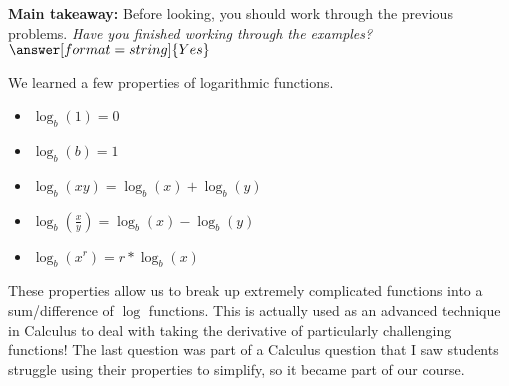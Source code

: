 \documentclass{ximera}
\begin{document}
\begin{question}
\textbf{Main takeaway:} Before looking, you should work through the previous problems. \textit{Have you finished working through the examples?} $\answer[format=string]{Yes}$
\begin{feedback}[correct]
We learned a few properties of logarithmic functions. 
\begin{itemize}
	\item $\log_b(1) = 0$
	\item $\log_b(b) = 1$
	\item $\log_b(xy) = \log_b{(x)} + \log_b{(y)}$
	\item $\log_b(\frac{x}{y}) = \log_b{(x)} - \log_b{(y)}$
	\item $\log_b(x^r) = r*\log_b{(x)}$
\end{itemize}

These properties allow us to break up extremely complicated functions into a sum/difference of $\log$ functions. This is actually used as an advanced technique in Calculus to deal with taking the derivative of particularly challenging functions! The last question was part of a Calculus question that I saw students struggle using their properties to simplify, so it became part of our course.
\end{feedback}
\end{question}
\end{document}
